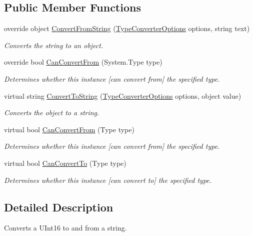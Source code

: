 \subsection*{Public Member Functions}
\begin{DoxyCompactItemize}
\item 
override object \hyperlink{a00158_a796e0b7b57d69abee122947166b45a9a}{Convert\-From\-String} (\hyperlink{a00154}{Type\-Converter\-Options} options, string text)
\begin{DoxyCompactList}\small\item\em Converts the string to an object. \end{DoxyCompactList}\item 
override bool \hyperlink{a00158_a202a9c2413a59423a51b439eab84a3bd}{Can\-Convert\-From} (System.\-Type type)
\begin{DoxyCompactList}\small\item\em Determines whether this instance \mbox{[}can convert from\mbox{]} the specified type. \end{DoxyCompactList}\item 
virtual string \hyperlink{a00068_a36cb2f9b24f15a671293f3a722324c27}{Convert\-To\-String} (\hyperlink{a00154}{Type\-Converter\-Options} options, object value)
\begin{DoxyCompactList}\small\item\em Converts the object to a string. \end{DoxyCompactList}\item 
virtual bool \hyperlink{a00068_a470d21adaa704eb281250dbd112ff91a}{Can\-Convert\-From} (Type type)
\begin{DoxyCompactList}\small\item\em Determines whether this instance \mbox{[}can convert from\mbox{]} the specified type. \end{DoxyCompactList}\item 
virtual bool \hyperlink{a00068_acb65bd8c8199d88d5b1629ae35d18514}{Can\-Convert\-To} (Type type)
\begin{DoxyCompactList}\small\item\em Determines whether this instance \mbox{[}can convert to\mbox{]} the specified type. \end{DoxyCompactList}\end{DoxyCompactItemize}


\subsection{Detailed Description}
Converts a U\-Int16 to and from a string. 



